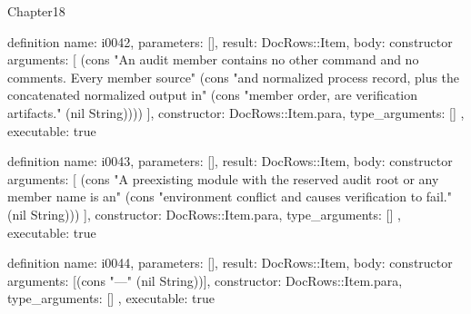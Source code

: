 \begin{lexlean}{Chapter18}
\begin{semanticmodule}
definition{
  name: i0042,
  parameters: [],
  result: DocRows::Item,
  body: constructor{
    arguments: [
      (cons "An audit member contains no other command and no comments. Every member source" (cons "and normalized process record, plus the concatenated normalized output in" (cons "member order, are verification artifacts." (nil String))))
    ],
    constructor: DocRows::Item.para,
    type_arguments: []
  },
  executable: true
}

definition{
  name: i0043,
  parameters: [],
  result: DocRows::Item,
  body: constructor{
    arguments: [
      (cons "A preexisting module with the reserved audit root or any member name is an" (cons "environment conflict and causes verification to fail." (nil String)))
    ],
    constructor: DocRows::Item.para,
    type_arguments: []
  },
  executable: true
}

definition{
  name: i0044,
  parameters: [],
  result: DocRows::Item,
  body: constructor{
    arguments: [(cons "---" (nil String))],
    constructor: DocRows::Item.para,
    type_arguments: []
  },
  executable: true
}
\end{semanticmodule}
\end{lexlean}
